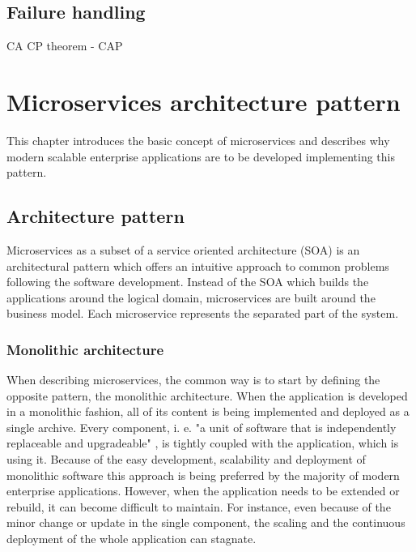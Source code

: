 \documentclass[oneside,
  digital, %
  table,   %
  nolof,     %
  nolot,     %
]{fithesis3}
\begin{document}
\section{Failure handling}





CA CP theorem - CAP




\chapter{Microservices architecture pattern}

This chapter introduces the basic concept of microservices and describes why modern scalable enterprise applications are to be developed implementing this pattern.

\section{Architecture pattern}

Microservices as a subset of a service oriented architecture (SOA) \cite{soa} is an architectural pattern which offers an intuitive approach to common problems following the software development. Instead of the SOA which builds the applications around the logical domain, microservices are built around the business model. Each microservice represents the separated part of the system.

\subsection{Monolithic architecture}

When describing microservices, the common way is to start by defining the opposite pattern, the monolithic architecture. When the application is developed in a monolithic fashion, all of its content is being implemented and deployed as a single archive. Every component, i. e. "a unit of software that is independently replaceable and upgradeable" \cite{microservices}, is tightly coupled with the application, which is using it. Because of the easy development, scalability and deployment of monolithic software this approach is being preferred by the majority of modern enterprise applications. However, when the application needs to be extended or rebuild, it can become difficult to maintain. For instance, even because of the minor change or update in the single component, the scaling and the continuous deployment of the whole application can stagnate. 
\end{document}
